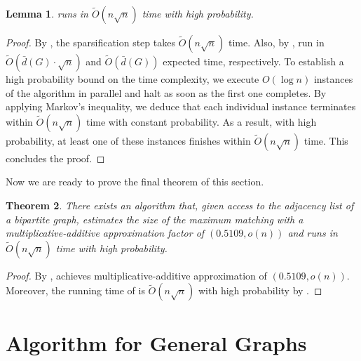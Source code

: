 \documentclass[letterpaper,11pt]{article}
\newcommand{\wt}[1]{\ensuremath{\widetilde{#1}}}
\newtheorem{lemma}{Lemma}[section]
\newtheorem{theorem}[lemma]{Theorem}
\begin{document}
\begin{lemma}\label{lem:final-time-1}
     runs in $\widetilde{O}(n\sqrt{n})$ time with high probability.
\end{lemma}
\begin{proof}
    By , the sparsification step takes $\wt{O}(n\sqrt{n})$ time. Also, by ,  run in $\widetilde{O}( \bar{d}(G) \cdot \sqrt{n})$ and $\widetilde{O}(\bar{d}(G))$ expected time, respectively. To establish a high probability bound on the time complexity, we execute $O(\log n)$ instances of the algorithm in parallel and halt as soon as the first one completes. By applying Markov’s inequality, we deduce that each individual instance terminates within $\widetilde{O}(n\sqrt{n})$ time with constant probability. As a result, with high probability, at least one of these instances finishes within $\widetilde{O}(n\sqrt{n})$ time. This concludes the proof.
\end{proof}



Now we are ready to prove the final theorem of this section.

\begin{theorem}
    There exists an algorithm that, given access to the adjacency list of a bipartite graph, estimates the size of the maximum matching with a multiplicative-additive approximation factor of $(0.5109, o(n))$ and runs in $\widetilde{O}(n\sqrt{n})$ time with high probability.
\end{theorem}
\begin{proof}
    By ,  achieves multiplicative-additive approximation of $(0.5109, o(n))$. Moreover, the running time of  is $\widetilde{O}(n\sqrt{n})$ with high probability by .
\end{proof}















 










\section{Algorithm for General Graphs}\label{sec:general}
\end{document}
